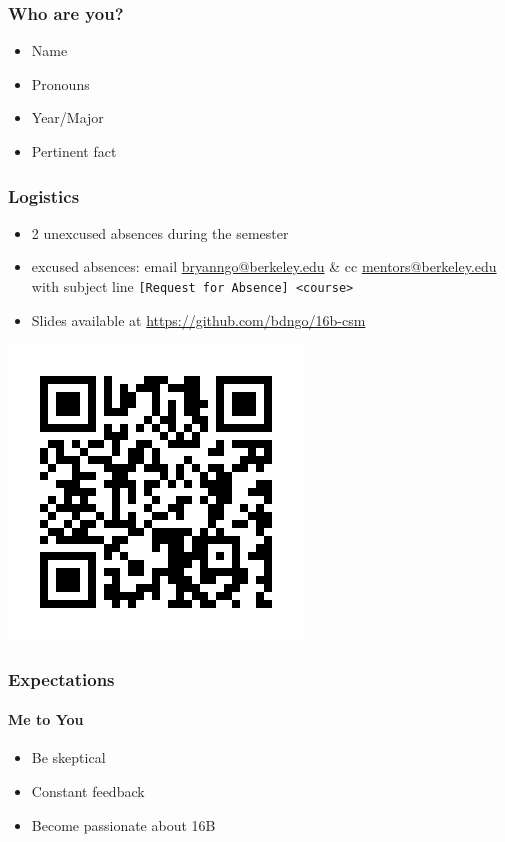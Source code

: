 \documentclass[aspectratio=169]{beamer}
\begin{document}
\begin{frame}
    \frametitle{Who are you?}

    \begin{itemize}
        \item Name
        \item Pronouns
        \item Year/Major
        \item Pertinent fact
    \end{itemize}
\end{frame}

\begin{frame}
    \frametitle{Logistics}

    \begin{itemize}
        \item 2 unexcused absences during the semester
        \item excused absences: email \href{mailto:bryanngo@berkeley.edu}{bryanngo@berkeley.edu} \& cc \href{mailto:mentors@berkeley.edu}{mentors@berkeley.edu} with subject line \texttt{[Request for Absence] <course>}
        \item Slides available at \url{https://github.com/bdngo/16b-csm}
    \end{itemize}

    \includegraphics[width=0.7\textheight]{qr-code.png}
\end{frame}

\begin{frame}
    \frametitle{Expectations}
    \framesubtitle{Me to You}

    \begin{itemize}
        \item Be skeptical
        \item Constant feedback
        \item Become passionate about 16B
    \end{itemize}
\end{frame}
\end{document}
